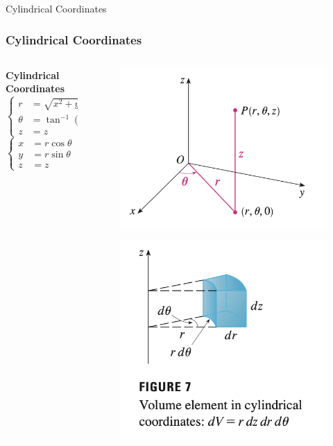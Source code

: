\documentclass[aspectratio=169, UTF8]{beamer}
\begin{document}
\begin{frame}{Cylindrical Coordinates}
    \frametitle{Cylindrical Coordinates}
    \begin{columns}
        \begin{column}{0.3\textwidth}
            \textbf{Cylindrical Coordinates} \\
            $\begin{cases}
                    r      & = \sqrt{x^2 + y^2}                  \\
                    \theta & = \tan^{-1}\left(\frac{y}{x}\right) \\
                    z      & = z
                \end{cases}$
            \\
            $\begin{cases}
                    x & = r\cos\theta \\
                    y & = r\sin\theta \\
                    z & = z
                \end{cases}$
        \end{column}

        \begin{column}{0.7\textwidth}
            \begin{figure}
                \centering
                \includegraphics[width=0.45\linewidth]{cc_1.png}
            \end{figure}
            \begin{figure}
                \centering
                \includegraphics[width=0.45\linewidth]{cc_2.png}
            \end{figure}
        \end{column}
    \end{columns}

\end{frame}
\end{document}
